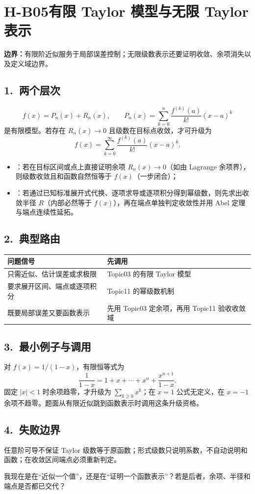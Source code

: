 \documentclass[UTF8,a4paper,10pt]{ctexart}
\begin{document}
\section*{H-B05\quad 有限 Taylor 模型与无限 Taylor 表示}
\textbf{边界：}有限阶近似服务于局部误差控制；无限级数表示还要证明收敛、余项消失以及定义域边界。
\subsection*{1.\ 两个层次}
\[
f(x)=P_n(x)+R_n(x),\qquad
P_n(x)=\sum_{k=0}^{n}\frac{f^{(k)}(a)}{k!}(x-a)^k
\]
是有限模型。若存在 $R_n(x)\to0$ 且级数在目标点收敛，才可升级为
\[
f(x)=\sum_{k=0}^{\infty}\frac{f^{(k)}(a)}{k!}(x-a)^k.
\]

\begin{center}

\end{center}

\begin{tcolorbox}[title=升级资格：两条独立证明路线]
\begin{itemize}
  \item {}：若在目标区间或点上直接证明余项 $R_n(x)\to0$（如由 Lagrange 余项界），则级数收敛且和函数自然恒等于 $f(x)$（一步闭合）；
  \item {}：若通过已知标准展开式代换、逐项求导或逐项积分得到幂级数，则先求出收敛半径 $R$（内部必然等于 $f(x)$），再在端点单独判定收敛性并用 Abel 定理与端点连续性延拓。
\end{itemize}
\end{tcolorbox}
\subsection*{2.\ 典型路由}
\begin{tabularx}{\linewidth}{@{}lX@{}}
\toprule
问题信号 & 先调用\\ \midrule
只需近似、估计误差或求极限 & Topic03 的有限 Taylor 模型\\
要求展开区间、端点或逐项积分 & Topic11 的幂级数机制\\
既要局部误差又要函数表示 & 先用 Topic03 定余项，再用 Topic11 验收收敛域\\
\bottomrule
\end{tabularx}
\subsection*{3.\ 最小例子与调用}
对 $f(x)=1/(1-x)$，有限恒等式为
\[
\frac1{1-x}=1+x+\cdots+x^n+\frac{x^{n+1}}{1-x}.
\]
固定 $\lvert x\rvert<1$ 时余项趋零，才升级为 $\sum_{k\ge0}x^k$；在 $x=1$ 公式无定义，在 $x=-1$ 余项不趋零。题面从有限近似跳到函数表示时调用这条升级资格。

\subsection*{4.\ 失败边界}
任意阶可导不保证 Taylor 级数等于原函数；形式级数只说明系数，不自动说明和函数；在收敛区间端点必须重新判定。
\begin{tcolorbox}[title=检查句]
我现在是在“近似一个值”，还是在“证明一个函数表示”？若是后者，余项、半径和端点是否都已交代？
\end{tcolorbox}
\end{document}
